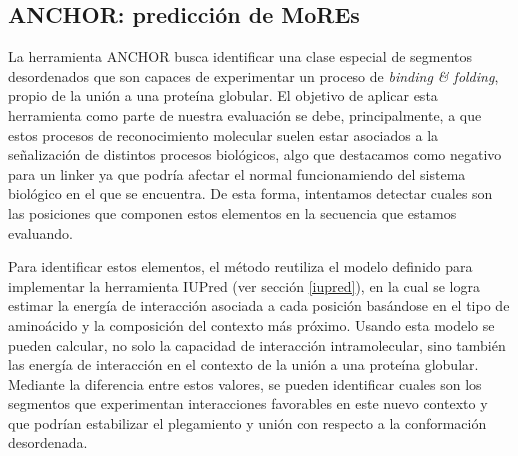 \subsection{ANCHOR: predicción de MoREs} \label{anchor}

La herramienta ANCHOR\cite{meszaros2009prediction} busca identificar una clase especial de segmentos desordenados que son capaces de experimentar un proceso de \textit{binding \& folding}, 
propio de la unión a una proteína globular. El objetivo de aplicar esta herramienta como parte de nuestra evaluación se debe, principalmente, a que estos procesos de reconocimiento molecular 
suelen estar asociados a la señalización de distintos procesos biológicos, algo que destacamos como negativo para un linker ya que podría afectar el normal funcionamiendo del sistema biológico en el que se encuentra. 
De esta forma, intentamos detectar cuales son las posiciones que componen estos elementos en la secuencia que estamos evaluando.


Para identificar estos elementos, el método reutiliza el modelo definido para implementar la herramienta IUPred (ver sección \ref{iupred}), en la cual se logra estimar la energía de interacción asociada a cada posición basándose en 
el tipo de aminoácido y la composición del contexto más próximo. Usando esta modelo se pueden calcular, no solo la capacidad de interacción intramolecular, 
sino también las energía de interacción en el contexto de la unión a una proteína globular.
Mediante la diferencia entre estos valores, se pueden identificar cuales son los segmentos que experimentan interacciones favorables en este nuevo contexto y que podrían estabilizar el plegamiento y unión con respecto a la conformación desordenada. 

